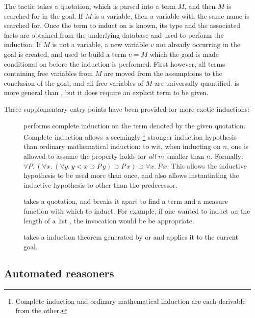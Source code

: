 The  tactic takes a quotation, which is parsed into a
term $M$, and then $M$ is searched for in the goal. If $M$ is a
variable, then a variable with the same name is searched for. Once the
term to induct on is known, its type and the associated facts are
obtained from the underlying database and used to perform the
induction.  If $M$ is not a variable, a new variable $v$ not already
occurring in the goal is created, and used to build a term $v = M$
which the goal is made conditional on before the induction is
performed. First however, all terms containing free variables from $M$
are moved from the assumptions to the conclusion of the goal, and all
free variables of $M$ are universally quantified.  is
more general than , but it does require an explicit term to
be given.

Three supplementary entry-points have been provided for more exotic
inductions:
\begin{description}
\item [] performs complete induction on the
  term denoted by the given quotation. Complete induction allows a
  seemingly \footnote{Complete induction and ordinary mathematical
    induction are each derivable from the other.} stronger induction
  hypothesis than ordinary mathematical induction: to wit, when
  inducting on $n$, one is allowed to assume the property holds for
  \emph{all} $m$ smaller than $n$. Formally: $\forall P.\ (\forall x.\
  (\forall y.\ y < x \supset P\, y) \supset P\,x) \supset \forall x.\
  P\,x$. This allows the inductive hypothesis to be used more than
  once, and also allows instantiating the inductive hypothesis to
  other than the predecessor.

\item [] takes a quotation, and breaks it
  apart to find a term and a measure function with which to induct.
  For example, if one wanted to induct on the length of a list
  \holtxt{L}, the invocation \ml{measureInduct\_on~`LENGTH L`}
  would be be appropriate.

\item [] takes a induction theorem generated by
 or  and applies it to the current goal.

\end{description}


\subsection{Automated reasoners}
\label{sec:automated-reasoners}

